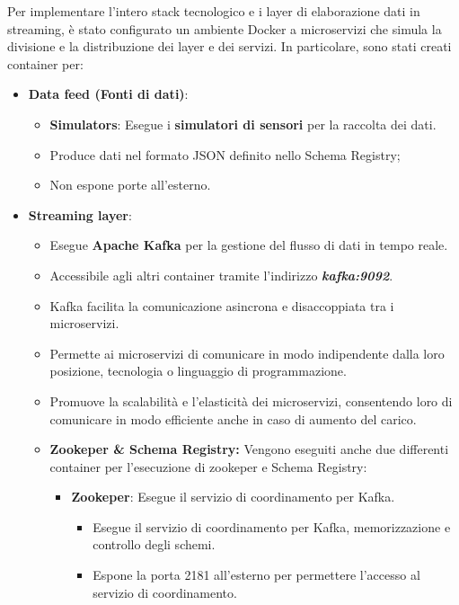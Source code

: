 Per implementare l'intero stack tecnologico e i layer di elaborazione dati in streaming, è stato configurato un ambiente Docker a microservizi che simula la divisione e la distribuzione dei layer e dei servizi. In particolare, sono stati creati container per:
\begin{itemize}
    \item \textbf{Data feed (Fonti di dati)}:
    \begin{itemize}
        \item \textbf{Simulators}: Esegue i \textbf{simulatori di sensori} per la raccolta dei dati.
        \item Produce dati nel formato JSON definito nello Schema Registry;
        \item Non espone porte all’esterno.
    \end{itemize} 
    \item \textbf{Streaming layer}:
    \begin{itemize}
        \item Esegue \textbf{Apache Kafka} per la gestione del flusso di dati in tempo reale.
        \item Accessibile agli altri container tramite l'indirizzo \textit{\textbf{kafka:9092}}.
        \item Kafka facilita la comunicazione asincrona e disaccoppiata tra i microservizi.
        \item Permette ai microservizi di comunicare in modo indipendente dalla loro posizione, tecnologia o linguaggio di programmazione.
        \item Promuove la scalabilità e l'elasticità dei microservizi, consentendo loro di comunicare in modo efficiente anche in caso di aumento del carico.
        \item \textbf{Zookeper \& Schema Registry:} Vengono eseguiti anche due differenti container per l'esecuzione di zookeper e Schema Registry:
            \begin{itemize}
                \item \textbf{Zookeper}: Esegue il servizio di coordinamento per Kafka.
                \begin{itemize}
                    \item Esegue il servizio di coordinamento per Kafka, memorizzazione e controllo degli schemi.
                    \item Espone la porta 2181 all'esterno per permettere l'accesso al servizio di coordinamento.
                \end{itemize}

\end{itemize}
\end{itemize}
\end{itemize}
